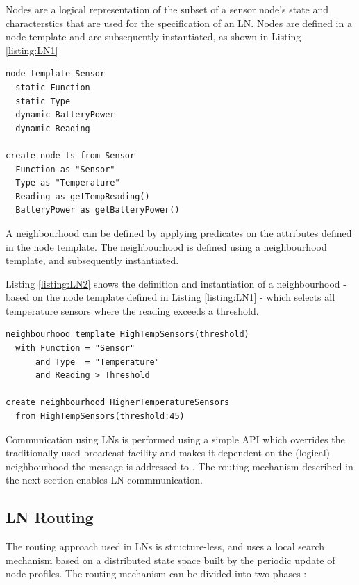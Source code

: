 Nodes are a logical representation of the subset of a sensor node's state and
characterstics that are used for the specification of an LN. Nodes are defined
in a node template and are subsequently instantiated, as shown in Listing \ref{listing:LN1}
   
\begin{lstlisting}[frame=trbl, basewidth={0.55em, 0.6em}, captionpos=b, 
basicstyle=\ttfamily\footnotesize, breaklines, caption = Node Definition and Instantiation, label = listing:LN1]  
node template Sensor
  static Function
  static Type
  dynamic BatteryPower
  dynamic Reading

create node ts from Sensor
  Function as "Sensor"
  Type as "Temperature"
  Reading as getTempReading()
  BatteryPower as getBatteryPower()
\end{lstlisting}

A neighbourhood can be defined by applying predicates on the attributes defined
in the
node template. The neighbourhood is defined using a neighbourhood
template, and subsequently instantiated. 

Listing \ref{listing:LN2} shows the definition and
instantiation of a
neighbourhood - based on the node template defined in Listing \ref{listing:LN1}
- which selects all temperature sensors where the reading exceeds a threshold.
 
\begin{lstlisting}[frame=trbl, basewidth={0.55em, 0.6em}, captionpos=b, 
basicstyle=\ttfamily\footnotesize, breaklines, caption = Neighbourhood Definition and Instantiation, label = listing:LN2]  
neighbourhood template HighTempSensors(threshold)
  with Function = "Sensor" 
      and Type  = "Temperature" 
      and Reading > Threshold

create neighbourhood HigherTemperatureSensors
  from HighTempSensors(threshold:45)
\end{lstlisting}

Communication using LNs is performed using a simple API which overrides the
traditionally used broadcast facility and makes it dependent on the (logical)
neighbourhood the message is addressed to \cite{mottola_LN:2006}. The routing mechanism described in
the next section enables LN commmunication.

\subsection{LN Routing}

The routing approach used in LNs is structure-less, and uses a local search
mechanism based on a distributed state space built by the periodic update of
node profiles. The routing mechanism can be divided into two phases \cite{mottola_LNAbstraction}:


